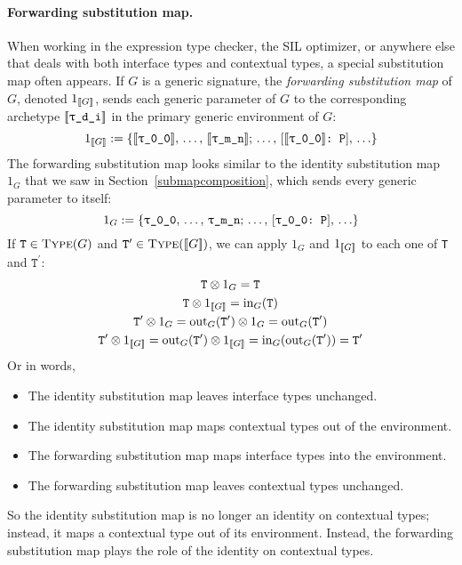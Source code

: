 \documentclass[../generics]{subfiles}
\begin{document}
\paragraph{Forwarding substitution map.} When working in the expression type checker, the SIL optimizer, or anywhere else that deals with both interface types and contextual types, a special substitution map often appears. If $G$ is a generic signature, the \emph{forwarding substitution map} of $G$, denoted $1_{[\![G]\!]}$, sends each generic parameter  of $G$ to the corresponding archetype $[\![\texttt{\texttt{$\uptau$\_d\_i}}]\!]$ in the primary generic environment of $G$:
\[1_{\EquivClass{G}}:=\{\archetype{\ttgp{0}{0}},\,\ldots,\,\archetype{\ttgp{m}{n}};\,\ldots,\,\ConfReq{$\archetype{\ttgp{0}{0}}$}{P},\,\ldots\}\]
The forwarding substitution map looks similar to the identity substitution map $1_G$ that we saw in Section~\ref{submapcomposition}, which sends every generic parameter to itself:
\[1_{G}:=\{\texttt{$\uptau$\_0\_0},\,\ldots,\,\texttt{$\uptau$\_m\_n};\,\ldots,\,[\texttt{\texttt{$\uptau$\_0\_0}:~P}],\,\ldots\}\]
If $\texttt{T}\in\textsc{Type}({G})$ and $\texttt{T}^\prime\in\textsc{Type}({[\![G]\!]})$, we can apply $1_G$ and $1_{[\![G]\!]}$ to each one of \texttt{T} and $\texttt{T}^\prime$:
\begin{gather*}
\texttt{T}\otimes 1_G=\texttt{T}\\
\texttt{T}\otimes 1_{[\![G]\!]}=\mathrm{in}_G(\texttt{T})\\
\texttt{T}^\prime\otimes 1_G=\mathrm{out}_G(\texttt{T}^\prime)\otimes 1_G=\mathrm{out}_G(\texttt{T}^\prime)\\
\texttt{T}^\prime\otimes 1_{[\![G]\!]}=\mathrm{out}_G(\texttt{T}^\prime)\otimes 1_{[\![G]\!]}=\mathrm{in}_G(\mathrm{out}_G(\texttt{T}^\prime))=\texttt{T}^\prime
\end{gather*}
Or in words,
\begin{itemize}
\item The identity substitution map leaves interface types unchanged.
\item The identity substitution map maps contextual types out of the environment.
\item The forwarding substitution map maps interface types into the environment.
\item The forwarding substitution map leaves contextual types unchanged.
\end{itemize}
So the identity substitution map is no longer an identity on contextual types; instead, it maps a contextual type out of its environment. Instead, the forwarding substitution map plays the role of the identity on contextual types.
\end{document}
